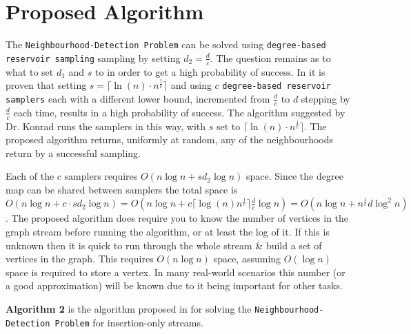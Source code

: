 \documentclass[11pt,twoside,a4paper]{report}
\begin{document}
\section{Proposed Algorithm}


The \texttt{Neighbourhood-Detection Problem} can be solved using \texttt{degree-based reservoir sampling} sampling by setting $d_2=\frac{d}c$. The question remains as to what to set $d_1$ and $s$ to in order to get a high probability of success. In \cite{orig} it is proven that setting $s=\lceil\ln(n)\cdot n^{\frac1c}\rceil$ and using $c$ \texttt{degree-based reservoir samplers} each with a different lower bound, incremented from $\frac{d}c$ to $d$ stepping by $\frac{d}c$ each time, results in a high probability of success. The algorithm suggested by Dr. Konrad runs the samplers in this way, with $s$ set to $\lceil\ln(n)\cdot n^{\frac1c}\rceil$. The proposed algorithm returns, uniformly at random, any of the neighbourhoods return by a successful sampling. %
\par Each of the $c$ samplers requires $O(n\log n+sd_2\log n)$ space. Since the degree map can be shared between samplers the total space is $O(n\log n+c\cdot sd_2\log n)=O(n\log n+c\lceil\log(n)n^{\frac1c}\rceil\frac{d}c\log n)=O(n\log n+n^{\frac1c}d\log^2n)$. %
The proposed algorithm does require you to know the number of vertices in the graph stream before running the algorithm, or at least the log of it. If this is unknown then it is quick to run through the whole stream \& build a set of vertices in the graph. This requires $O(n\log n)$ space, assuming $O(\log n)$ space is required to store a vertex. In many real-world scenarios this number (or a good approximation) will be known due to it being important for other tasks.
\par \textbf{Algorithm 2} is the algorithm proposed in \cite{orig} for solving the \texttt{Neighbourhood-Detection Problem} for insertion-only streams.\\
\end{document}

